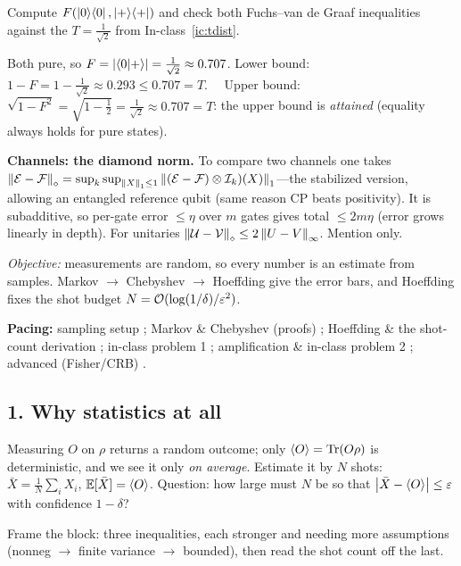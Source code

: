 \documentclass[11pt]{article}
\begin{document}
\begin{inclass}\label{ic:fid}
Compute $F(\ket{0}\!\bra{0},\ket{+}\!\bra{+})$ and check both Fuchs--van de Graaf inequalities against the
$T=\tfrac1{\sqrt2}$ from In-class~\ref{ic:tdist}.
\end{inclass}
\begin{answer}
Both pure, so $F=\left\lvert \braket{0|+} \right\rvert=\tfrac1{\sqrt2}\approx0.707$. Lower bound:
$1-F=1-\tfrac1{\sqrt2}\approx0.293\le0.707=T$. \checkmark\ \ Upper bound:
$\sqrt{1-F^2}=\sqrt{1-\tfrac12}=\tfrac1{\sqrt2}\approx0.707=T$: the upper bound is
\emph{attained} (equality always holds for pure states). \checkmark
\end{answer}

\begin{advanced}
\textbf{Channels: the diamond norm.} To compare two channels one takes
$\left\lVert \mathcal E-\mathcal F \right\rVert_\diamond=\sup_k\sup_{\left\lVert X \right\rVert_1\le1}\left\lVert (\mathcal E-\mathcal F)\otimes\mathcal I_k)(X) \right\rVert_1$---the
stabilized version, allowing an entangled reference qubit (same reason CP beats
positivity). It is subadditive, so per-gate error $\le\eta$ over $m$ gates gives
total $\le2m\eta$ (error grows linearly in depth). For unitaries
$\left\lVert \mathcal U-\mathcal V \right\rVert_\diamond\le2\left\lVert U-V \right\rVert_\infty$. Mention only.
\end{advanced}

\noindent\emph{Objective:} measurements are random, so every number is an estimate
from samples. Markov $\to$ Chebyshev $\to$ Hoeffding give the error bars, and
Hoeffding fixes the shot budget $N=\mathcal{O}(\log(1/\delta)/\varepsilon^2)$.

\medskip
\noindent\textbf{Pacing:} sampling setup ; Markov \& Chebyshev (proofs)
; Hoeffding \& the shot-count derivation ; in-class problem 1
; amplification \& in-class problem 2 ; advanced (Fisher/CRB)
.

\subsection*{1. Why statistics at all }
\begin{board}
Measuring $O$ on $\rho$ returns a random outcome; only $\langle O\rangle=\operatorname{Tr}(O\rho)$
is deterministic, and we see it only \emph{on average}. Estimate it by $N$ shots:
$\bar X=\tfrac1N\sum_i X_i$, $\mathbb{E}[\bar X]=\langle O\rangle$. Question: how large must
$N$ be so that $\left\lvert \bar X-\langle O\rangle \right\rvert\le\varepsilon$ with confidence $1-\delta$?
\end{board}
Frame the block: three inequalities, each stronger and needing more assumptions
(nonneg $\to$ finite variance $\to$ bounded), then read the shot count off the last.
\end{document}
